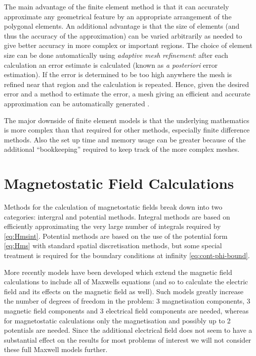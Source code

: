 The main advantage of the finite element method is that it can accurately approximate any geometrical feature by an appropriate arrangement of the polygonal elements.
An additional advantage is that the size of elements (and thus the accuracy of the approximation) can be varied arbitrarily as needed to give better accuracy in more complex or important regions. 
The choice of element size can be done automatically using \emph{adaptive mesh refinement}: after each calculation an error estimate is calculated (known as \emph{a posteriori} error estimation).
If the error is determined to be too high anywhere the mesh is refined near that region and the calculation is repeated.
Hence, given the desired error and a method to estimate the error, a mesh giving an efficient and accurate approximation can be automatically generated \cite{Schrefl1999}.

The major downside of finite element models is that the underlying mathematics is more complex than that required for other methods, especially finite difference methods.
Also the set up time and memory usage can be greater because of the additional ``bookkeeping'' required to keep track of the more complex meshes.

\section{Magnetostatic Field Calculations}
\label{sec:magn-field-calc}

Methods for the calculation of magnetostatic fields break down into two categories: intergral and potential methods.
Integral methods are based on efficiently approximating the very large number of integrals required by \cref{eq:Hmsint}.
Potential methods are based on the use of the potential form \cref{eq:Hms} with standard spatial discretisation methods, but some special treatment is required for the boundary conditions at infinity \cref{eq:cont-phi-bound}.

More recently models have been developed which extend the magnetic field calculations to include all of Maxwells equations (and so to calculate the electric field and its effects on the magnetic field as well).
Such models greatly increase the number of degrees of freedom in the problem: 3 magnetisation components, 3 magnetic field components and 3 electrical field components are needed, whereas for magnetostatic calculations only the magnetisation and possibly up to 2 potentials are needed.
Since the additional electrical field does not seem to have a substantial effect on the results for most problems of interest we will not consider these full Maxwell models further.

